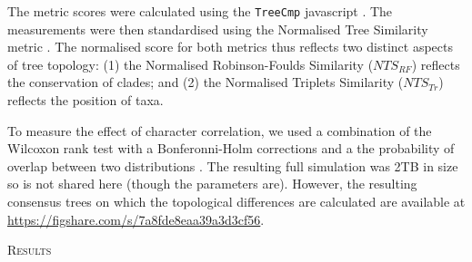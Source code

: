 \documentclass[12pt,letterpaper]{article}
\renewcommand{\section}[1]{%
\bigskip
\begin{center}
\begin{Large}
\normalfont\scshape #1
\medskip
\end{Large}
\end{center}}
\begin{document}
The metric scores were calculated using the \texttt{TreeCmp} javascript \citep{Bogdanowicz2012}.
The measurements were then standardised using the Normalised Tree Similarity metric \citep[$NTS$; centering and scaling the metric score to the number of taxa;][]{Bogdanowicz2012,Guillerme2016146}.
The normalised score for both metrics thus reflects two distinct aspects of tree topology: (1) the Normalised Robinson-Foulds Similarity ($NTS_{RF}$)  reflects the conservation of clades; and (2) the Normalised Triplets Similarity ($NTS_{Tr}$) reflects the position of taxa.

To measure the effect of character correlation, we used a combination of the Wilcoxon rank test with a Bonferonni-Holm corrections \citep{holm1979simple} and a the probability of overlap between two distributions \citep[the Bhattacharyya Coefficient: $BC$;][]{Bhattacharyya}.
The resulting full simulation was 2TB in size so is not shared here (though the parameters are).
However, the resulting consensus trees on which the topological differences are calculated are available at \url{https://figshare.com/s/7a8fde8eaa39a3d3cf56}.

%
%
\section{Results}
\end{document}

